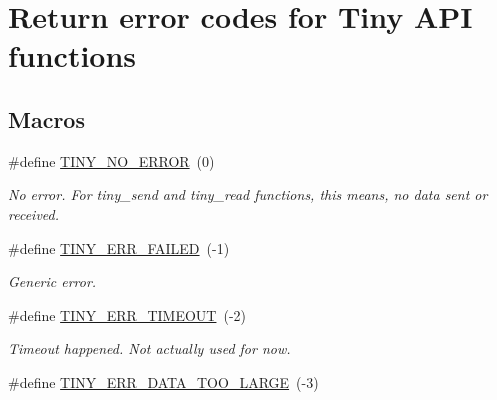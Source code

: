 \hypertarget{group__ERROR__FLAGS}{}\section{Return error codes for Tiny A\+P\+I functions}
\label{group__ERROR__FLAGS}
\subsection*{Macros}
\begin{DoxyCompactItemize}
\item 
\hypertarget{group__ERROR__FLAGS_ga69c869a686b67bf0b7b8115599515d61}{}\#define \hyperlink{group__ERROR__FLAGS_ga69c869a686b67bf0b7b8115599515d61}{T\+I\+N\+Y\+\_\+\+N\+O\+\_\+\+E\+R\+R\+O\+R}~(0)\label{group__ERROR__FLAGS_ga69c869a686b67bf0b7b8115599515d61}

\begin{DoxyCompactList}\small\item\em No error. For tiny\+\_\+send and tiny\+\_\+read functions, this means, no data sent or received. \end{DoxyCompactList}\item 
\hypertarget{group__ERROR__FLAGS_ga84e6ca143550038e1a71cf36078d1926}{}\#define \hyperlink{group__ERROR__FLAGS_ga84e6ca143550038e1a71cf36078d1926}{T\+I\+N\+Y\+\_\+\+E\+R\+R\+\_\+\+F\+A\+I\+L\+E\+D}~(-\/1)\label{group__ERROR__FLAGS_ga84e6ca143550038e1a71cf36078d1926}

\begin{DoxyCompactList}\small\item\em Generic error. \end{DoxyCompactList}\item 
\hypertarget{group__ERROR__FLAGS_gac9ba8076a1eb8613e8d1f07629ff0cd1}{}\#define \hyperlink{group__ERROR__FLAGS_gac9ba8076a1eb8613e8d1f07629ff0cd1}{T\+I\+N\+Y\+\_\+\+E\+R\+R\+\_\+\+T\+I\+M\+E\+O\+U\+T}~(-\/2)\label{group__ERROR__FLAGS_gac9ba8076a1eb8613e8d1f07629ff0cd1}

\begin{DoxyCompactList}\small\item\em Timeout happened. Not actually used for now. \end{DoxyCompactList}\item 
\hypertarget{group__ERROR__FLAGS_ga7bbe7440d11ad304b0af68e011f4eab7}{}\#define \hyperlink{group__ERROR__FLAGS_ga7bbe7440d11ad304b0af68e011f4eab7}{T\+I\+N\+Y\+\_\+\+E\+R\+R\+\_\+\+D\+A\+T\+A\+\_\+\+T\+O\+O\+\_\+\+L\+A\+R\+G\+E}~(-\/3)\label{group__ERROR__FLAGS_ga7bbe7440d11ad304b0af68e011f4eab7}


\end{DoxyCompactItemize}
